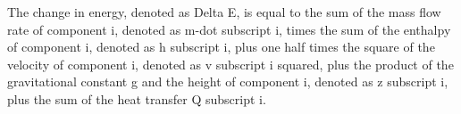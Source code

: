 The change in energy, denoted as Delta E, is equal to the sum of the mass flow rate of component i, denoted as m-dot subscript i, times the sum of the enthalpy of component i, denoted as h subscript i, plus one half times the square of the velocity of component i, denoted as v subscript i squared, plus the product of the gravitational constant g and the height of component i, denoted as z subscript i, plus the sum of the heat transfer Q subscript i.